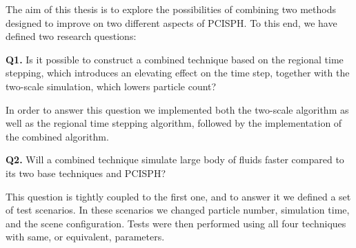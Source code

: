 \documentclass[../../main.tex]{subfiles}
\begin{document}
\tracingall

The aim of this thesis is to explore the possibilities of combining two methods designed to improve on two different aspects of PCISPH. To this end, we have defined two research questions: 

\begin{displayquote}
{\large \textbf{Q1.}} 
Is it possible to construct a combined technique based on the regional time stepping, which introduces an elevating effect on the time step, together with the two-scale simulation, which lowers particle count?
\end{displayquote} 

In order to answer this question we implemented both the two-scale algorithm as well as the regional time stepping algorithm, followed by the implementation of the combined algorithm. 

\begin{displayquote}
{\large \textbf{Q2.}} Will a combined technique simulate large body of fluids faster compared to its two base techniques and PCISPH?
\end{displayquote}

This question is tightly coupled to the first one, and to answer it we defined a set of test scenarios. In these scenarios we changed particle number, simulation time, and the scene configuration. Tests were then performed using all four techniques with same, or equivalent, parameters. 
\end{document}
